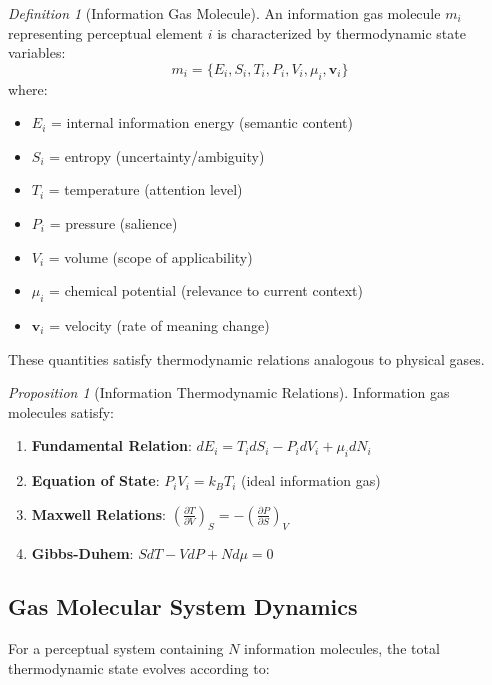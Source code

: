 \documentclass[12pt]{article}
\newtheorem{proposition}[theorem]{Proposition}
\theoremstyle{definition}
\newtheorem{definition}[theorem]{Definition}
\theoremstyle{remark}
\newtheorem{definition}[theorem]{Definition}
\newtheorem{proposition}[theorem]{Proposition}
\begin{document}
\begin{definition}[Information Gas Molecule]
\label{def:info_gas_molecule}
An information gas molecule $m_i$ representing perceptual element $i$ is characterized by thermodynamic state variables:
\begin{equation}
m_i = \{E_i, S_i, T_i, P_i, V_i, \mu_i, \mathbf{v}_i\}
\end{equation}
where:
\begin{itemize}
\item $E_i$ = internal information energy (semantic content)
\item $S_i$ = entropy (uncertainty/ambiguity)
\item $T_i$ = temperature (attention level)
\item $P_i$ = pressure (salience)
\item $V_i$ = volume (scope of applicability)
\item $\mu_i$ = chemical potential (relevance to current context)
\item $\mathbf{v}_i$ = velocity (rate of meaning change)
\end{itemize}
\end{definition}

These quantities satisfy thermodynamic relations analogous to physical gases.

\begin{proposition}[Information Thermodynamic Relations]
\label{prop:info_thermo_relations}
Information gas molecules satisfy:
\begin{enumerate}
\item \textbf{Fundamental Relation}: $dE_i = T_i dS_i - P_i dV_i + \mu_i dN_i$
\item \textbf{Equation of State}: $P_i V_i = k_B T_i$ (ideal information gas)
\item \textbf{Maxwell Relations}: $\left(\frac{\partial T}{\partial V}\right)_S = -\left(\frac{\partial P}{\partial S}\right)_V$
\item \textbf{Gibbs-Duhem}: $S dT - V dP + N d\mu = 0$
\end{enumerate}
\end{proposition}

\subsection{Gas Molecular System Dynamics}

For a perceptual system containing $N$ information molecules, the total thermodynamic state evolves according to:
\end{document}
